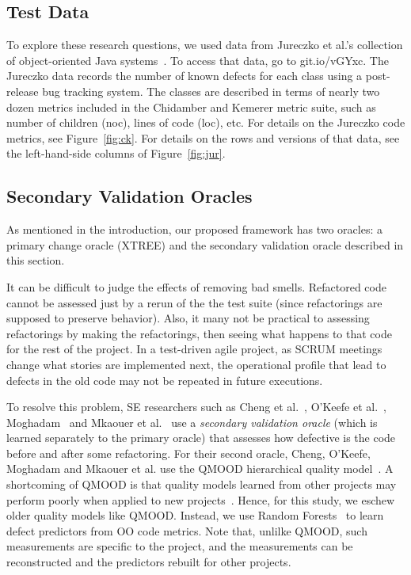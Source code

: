 \documentclass[twocolumn,5p]{elsarticle}
\newcommand{\fig}[1]{Figure~\ref{fig:#1}}
\theoremstyle{break}
\begin{document}
\begin{itemize}
\subsection{Test Data}\label{sect:tesd}

To explore these research questions,
we used data from
Jureczko et al.'s collection of object-oriented Java systems~\cite{jureczko10}. To access that data, go to   git.io/vGYxc.
The Jureczko data records the number of known defects for each class using a post-release bug tracking system. The classes are described in terms of nearly two dozen metrics included in the Chidamber and Kemerer metric suite, such as number of children (noc), lines of code (loc), etc. For details on the Jureczko code
metrics, see  \fig{ck}. For details on the rows and versions
of that data, see the left-hand-side columns of \fig{jur}.



 
\subsection{Secondary Validation Oracles}
\label{sect:eval}

As mentioned in the introduction, our proposed framework has two oracles:
a primary change oracle (XTREE) and the secondary validation oracle described in this section.

It can be difficult  to judge the  effects of removing bad smells.
Refactored code cannot be assessed just by a rerun of the the test
suite (since refactorings are supposed to preserve behavior). 
Also, it many not be practical
 to assessing refactorings by making the
refactorings,  then seeing what happens to that code for the rest
of the project. In a test-driven agile project, as
SCRUM meetings change what stories are implemented next,
the operational profile that lead to defects in the old
code may not be repeated in future executions. 

To resolve this  problem, SE researchers such as 
Cheng et al.~\cite{Cheng10}, O'Keefe et al.~\cite{OKeeffe08,OKeeffe07},
Moghadam~\cite{Moghadam2011} and Mkaouer et al.~\cite{Mkaouer14}
use a {\em secondary validation oracle} (which is learned separately
to the primary oracle) that   assesses
how defective is the code before and after some
refactoring. 
For their second oracle,
 Cheng, O'Keefe, Moghadam and  Mkaouer et al. use the QMOOD hierarchical
quality model~\cite{Bansiya02}.
A shortcoming of QMOOD
is that quality models learned from other projects
may perform poorly when applied to new projects~\cite{localvsglobal}.
Hence, for this study, we  eschew
older quality models like QMOOD. Instead, we use
Random Forests~\cite{Breiman2001} to learn defect predictors
from OO code metrics.
Note that, unlilke QMOOD, such measurements 
  are specific to the project, and the measurements can be reconstructed and the predictors rebuilt for other projects.
 

\end{itemize}
\end{document}
